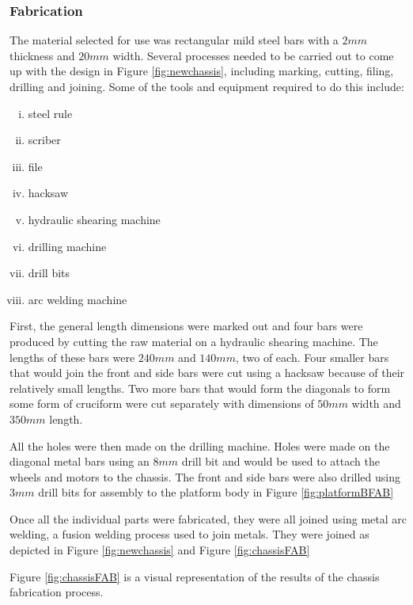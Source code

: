 \subsubsection{Fabrication}
\label{sec:chassisFAB}
The material selected for use was rectangular mild steel bars with a $2mm$ thickness and $20mm$ width. Several processes needed to be carried out to come up with the design in Figure \ref{fig:newchassis}, including marking, cutting, filing, drilling and joining.
Some of the tools and equipment required to do this include: 
\begin{enumerate}[i.]
    \item steel rule
    \item scriber
    \item file
    \item hacksaw
    \item hydraulic shearing machine
    \item drilling machine
    \item drill bits
    \item arc welding machine
\end{enumerate}

First, the general length dimensions were marked out and four bars were produced by cutting the raw material on a hydraulic shearing machine. The lengths of these bars were $240mm$ and $140mm$, two of each. Four smaller bars that would join the front and side bars were cut using a hacksaw because of their relatively small lengths. 
Two more bars that would form the diagonals to form some form of cruciform were cut separately with dimensions of $50mm$ width and $350mm$ length. 
\par
All the holes were then made on the drilling machine. Holes were made on the diagonal metal bars using an $8mm$ drill bit and would be used to attach the wheels and motors to the chassis. The front and side bars were also drilled using $3mm$ drill bits for assembly to the platform body in Figure \ref{fig:platformBFAB}
\par
Once all the individual parts were fabricated, they were all joined using metal arc welding, a fusion welding process used to join metals. They were joined as depicted in Figure \ref{fig:newchassis} and Figure \ref{fig:chassisFAB}
\par
Figure \ref{fig:chassisFAB} is a visual representation of the results of the chassis fabrication process.

